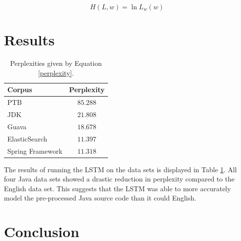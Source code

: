 \documentclass{article}
\begin{document}
\begin{equation}
    H(L,w) = \ln L_w(w)
\end{equation}



\section{Results}

\begin{table}[t]
    \caption{Perplexities given by Equation \ref{perplexity}.}
    \label{result-table}
    \vskip 0.15in
    \begin{center}
    \begin{tabular}{lc}
    \hline
    \abovespace\belowspace
    Corpus & Perplexity \\%
    \hline
    \abovespace
    PTB                 & $85.288$ \\%
    JDK                 & $21.808$ \\%
    Guava               & $18.678$ \\%
    ElasticSearch       & $11.397$ \\%
    \belowspace
    Spring Framework    & $11.318$ \\%
    \hline
    \end{tabular}
    \end{center}
    \vskip -0.1in
\end{table}

The results of running the LSTM on the data sets is displayed in
Table \ref{result-table}. All four Java data sets showed a drastic reduction
in perplexity compared to the English data set. This suggests that the
LSTM was able to more accurately model the pre-processed Java source code
than it could English.

\section{Conclusion}
\end{document}
